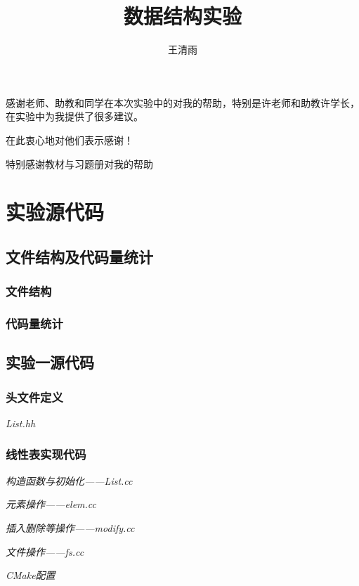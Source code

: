 \documentclass[format=draft,language=chinese,category=academic-report]{hustreport}
\title{数据结构实验}
\author{王清雨}
\begin{document}
\frontmatter
\maketitle
\tableofcontents

\mainmatter




\backmatter

\begin{ack}
    感谢老师、助教和同学在本次实验中的对我的帮助，特别是许老师和助教许学长，在实验中为我提供了很多建议。
    \par
    在此衷心地对他们表示感谢！
    \par
    特别感谢教材\cite{严蔚敏2002数据结构}与习题册\cite{严蔚敏1998数据结构题集}对我的帮助
\end{ack}



\appendix

\chapter{实验源代码}\label{appendix:1}
\section{文件结构及代码量统计}\label{appendix:structure}
\subsection{文件结构}

\subsection{代码量统计}

\section{实验一源代码}\label{appendix:lab1}
\subsection{头文件定义}\label{appendix:h1}
\emph{List.hh}

\subsection{线性表实现代码}
\emph{构造函数与初始化——List.cc}

\emph{元素操作——elem.cc}

\emph{插入删除等操作——modify.cc}

\emph{文件操作——fs.cc}

\emph{CMake配置}

\end{document}

